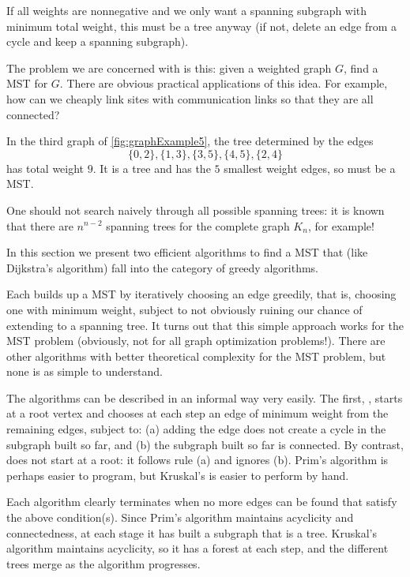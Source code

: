 \begin{note}If all weights are nonnegative and we
only want a spanning subgraph with minimum total weight, this must be a
tree anyway (if not, delete an edge from a cycle and keep a spanning
subgraph).
\end{note}

The problem we are concerned with is this: given a weighted graph $G$,
find a MST for $G$. There are obvious practical applications of this
idea. For example, how can we cheaply link sites with communication
links so that they are all connected?

\begin{Example}
In the third graph of \cref{fig:graphExample5}, the tree
determined by the edges 
$$\{0, 2\}, \{1, 3\}, \{3, 5\}, \{4, 5\}, \{2, 4\}$$ 
has total weight $9$. It is a tree and has the $5$ smallest weight
edges, so must be a MST.
\end{Example}

One should not search naively through all possible spanning trees: it is
known that there are $n^{n-2}$ spanning trees for the complete graph
$K_n$, for example!

In this section we present two efficient algorithms to find a MST that
(like Dijkstra's algorithm) fall into the category of greedy algorithms. 

Each builds up a MST by iteratively choosing an edge greedily, that is,
choosing one with minimum weight, subject to not obviously ruining our
chance of extending to a spanning tree. It turns out that this simple
approach works for the MST problem (obviously, not for all graph
optimization problems!). There are other algorithms with better
theoretical complexity for the MST problem, but none is as simple to
understand.

The algorithms can be described in an informal way very easily. The
first, , starts at a root vertex and chooses
at each step an edge of minimum weight from the remaining edges, subject
to: (a) adding the edge does not create a cycle in the subgraph built so
far, and (b) the subgraph built so far is connected. By contrast,
 does not start at a root: it follows
rule (a) and ignores (b). Prim's algorithm is perhaps easier to program,
but Kruskal's is easier to perform by hand.

Each algorithm clearly terminates when no more edges can be found
that satisfy the above condition(s). Since Prim's algorithm maintains
acyclicity and connectedness, at each stage it has built a subgraph that
is a tree. Kruskal's algorithm maintains acyclicity, so it has a forest
at each step, and the different trees merge as the algorithm progresses.

